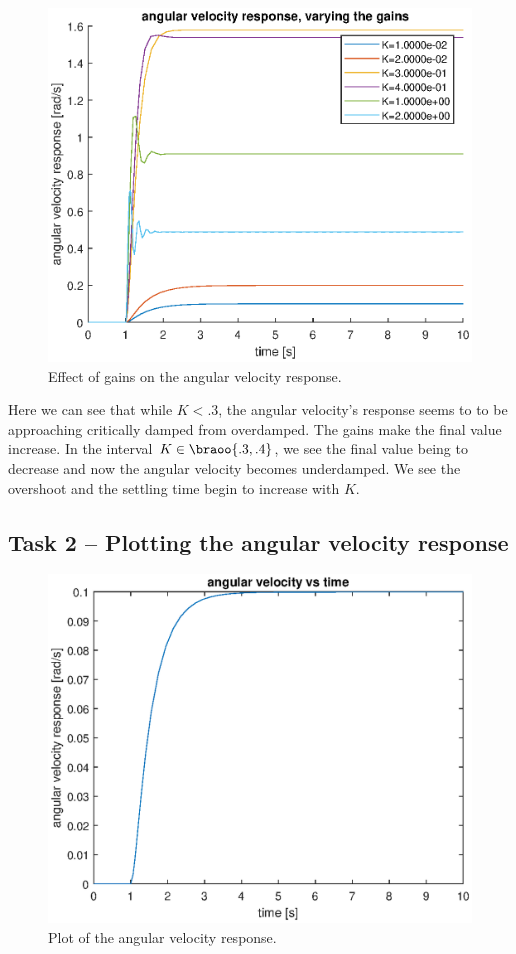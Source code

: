 \documentclass[12pt]{article}
\begin{document}
\begin{figure}
    \centering
    \includegraphics[width=\linewidth]{img/task01_varying_gains.eps}
    \caption{Effect of gains on the angular velocity response.}
    \label{fig:gains on angular velocity}
\end{figure}

Here we can see that while $K < .3$, the angular velocity's response seems to to be approaching critically damped from overdamped.
The gains make the final value increase.
In the interval $K \in \braoo{.3, .4}$, we see the final value being to decrease and now the angular velocity becomes underdamped. We see the overshoot and the settling time begin to increase with $K$.

\subsection{Task 2 -- Plotting the angular velocity response}

\begin{figure}
    \centering
    \includegraphics[width=\linewidth]{img/task02_plot_angular_velocity.eps}
    \caption{Plot of the angular velocity response.}
    \label{fig:plot of angular velocity}
\end{figure}
\end{document}
